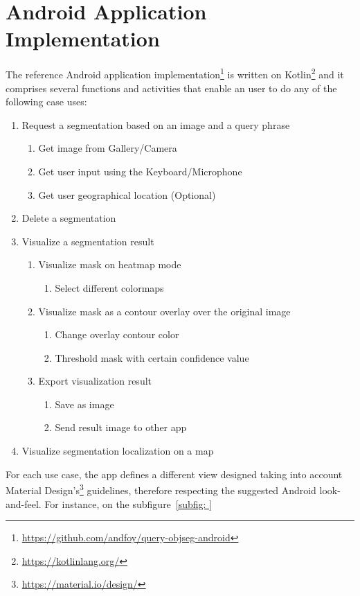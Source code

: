 \section{Android Application Implementation}
The reference Android application implementation\footnote{\url{https://github.com/andfoy/query-objseg-android}} is written on Kotlin\footnote{\url{https://kotlinlang.org/}} and it comprises several functions and activities that enable an user to do any of the following case uses:
\begin{enumerate}
    \item Request a segmentation based on an image and a query phrase \label{case:req}
    \begin{enumerate}
        \item Get image from Gallery/Camera
        \item Get user input using the Keyboard/Microphone
        \item Get user geographical location (Optional)
    \end{enumerate}
    \item Delete a segmentation
    \item Visualize a segmentation result
    \begin{enumerate}
        \item Visualize mask on heatmap mode
        \begin{enumerate}
            \item Select different colormaps
        \end{enumerate}    
        \item Visualize mask as a contour overlay over the original image
        \begin{enumerate}
            \item Change overlay contour color
            \item Threshold mask with certain confidence value
        \end{enumerate}
        \item Export visualization result
        \begin{enumerate}
            \item Save as image
            \item Send result image to other app
        \end{enumerate}
    \end{enumerate}
    \item Visualize segmentation localization on a map 
\end{enumerate}

For each use case, the app defines a different view designed taking into account Material Design's\footnote{\url{https://material.io/design/}} guidelines, therefore respecting the suggested Android look-and-feel. For instance, on the subfigure~\ref{subfig: }

